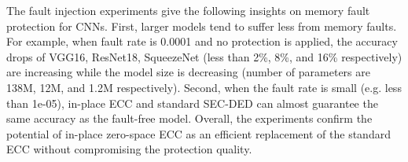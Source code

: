 \documentclass{article}
\begin{document}
The fault injection experiments give the following insights on memory fault protection for CNNs. First, larger models tend to suffer less from memory faults. For example, when fault rate is 0.0001 and no protection is applied, the accuracy drops of VGG16, ResNet18, SqueezeNet (less than 2\%, 8\%, and 16\% respectively) are increasing while the model size is decreasing (number of parameters are 138M, 12M, and 1.2M respectively).  
Second, when the fault rate is small (e.g. less than 1e-05), in-place ECC and standard SEC-DED can almost guarantee the same accuracy as the fault-free model. Overall, the experiments confirm the potential of in-place zero-space ECC as an efficient replacement of the standard ECC without compromising the protection quality.

\end{document}
